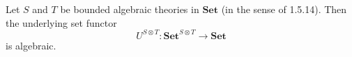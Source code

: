 Let $S$ and $T$ be bounded algebraic theories in $\mathbf{Set}$ (in the sense of 1.5.14). Then the underlying set functor
$$
U^{S \otimes T}: \mathbf{Set}^{S \otimes T} \to \mathbf{Set}
$$
is algebraic.
